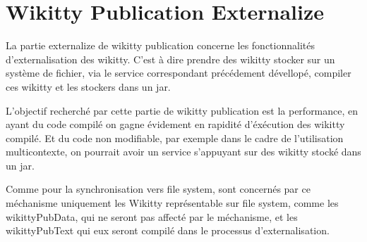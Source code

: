 


\section{Wikitty Publication Externalize}

La partie externalize de wikitty publication concerne les fonctionnalités 
d'externalisation des wikitty. C'est à dire prendre des wikitty stocker sur un 
système de fichier, via le service correspondant précédement dévellopé, compiler
ces wikitty et les stockers dans un jar.

L'objectif recherché par cette partie de wikitty publication est la performance,
en ayant du code compilé on gagne évidement en rapidité d'éxécution des wikitty
compilé. Et du code non modifiable, par exemple dans le cadre de l'utilisation 
multicontexte, on pourrait avoir un service s'appuyant sur des wikitty stocké 
dans un jar.

Comme pour la synchronisation vers file system, sont concernés par ce méchanisme
uniquement les Wikitty représentable sur file system, comme les wikittyPubData,
qui ne seront pas affecté par le méchanisme, et les wikittyPubText qui eux seront
compilé dans le processus d'externalisation.

